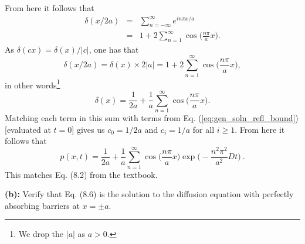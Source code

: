 From here it follows that
\begin{eqnarray}
\delta(x/2a) &=& \sum_{n=-\infty}^{\infty} e^{i n \pi x /a} \nonumber \\
&=& 1 + 2 \sum_{n=1}^{\infty} \cos\bigg(\frac{n \pi}{a} x \bigg).
\end{eqnarray}
As $\delta(c x) = \delta(x) / |c|$, one has that
\begin{equation}
\delta(x/2a) = \delta(x) \times 2 |a| = 1 + 2 \sum_{n=1}^{\infty} \cos\bigg(\frac{n \pi}{a} x \bigg), \nonumber
\end{equation}
in other words\footnote{We drop the $|a|$ as $a>0$.}
\begin{equation}
\delta(x) = \frac{1}{2a} + \frac{1}{a} \sum_{n=1}^{\infty} \cos\bigg(\frac{n \pi}{a} x \bigg).
\end{equation}
Matching each term in this sum with terms from Eq. (\ref{eq:gen_soln_refl_bound}) [evaluated at $t=0$] gives us $c_0 = 1/2a$ and $c_i = 1/a$ for all $i\geq 1$. From here it follows that
\begin{equation}
\boxed{p(x,t) = \frac{1}{2 a} +  \frac{1}{a}\sum_{n=1}^{\infty} \cos\bigg(\frac{n \pi}{a} x \bigg) \exp\bigg(-\frac{n^2 \pi^2}{a^2} D t \bigg)}~.
\end{equation}
This matches Eq. (8.2) from the textbook.

\textbf{(b):} Verify that Eq. (8.6) is the solution to the diffusion equation with perfectly absorbing barriers at $x=\pm a$.

